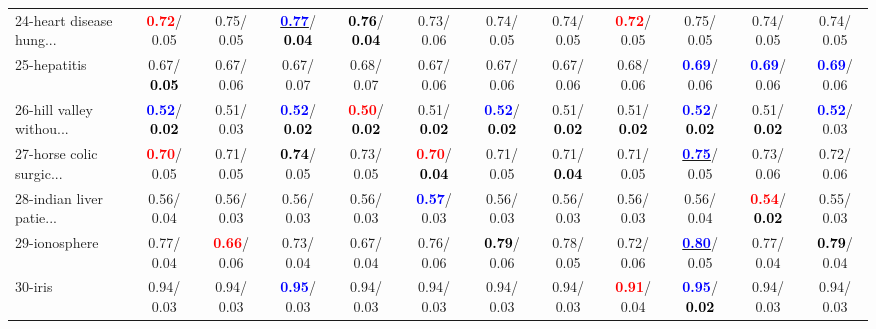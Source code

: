 \begin{table}[h]
\begin{center}
{\begin{tabular}{lc|c|c|c|c|c|c|c|c|c|c}
24-heart disease hung... & \textcolor{red}{\textbf{  0.72}}/  0.05 &   0.75/  0.05 & \underline{\textcolor{blue}{\textbf{  0.77}}}/\textcolor{black}{\textbf{  0.04}} & \textcolor{black}{\textbf{  0.76}}/\textcolor{black}{\textbf{  0.04}} &   0.73/  0.06 &   0.74/  0.05 &   0.74/  0.05 & \textcolor{red}{\textbf{  0.72}}/  0.05 &   0.75/  0.05 &   0.74/  0.05 &   0.74/  0.05 \\
25-hepatitis &   0.67/\textcolor{black}{\textbf{  0.05}} &   0.67/  0.06 &   0.67/  0.07 &   0.68/  0.07 &   0.67/  0.06 &   0.67/  0.06 &   0.67/  0.06 &   0.68/  0.06 & \textcolor{blue}{\textbf{  0.69}}/  0.06 & \textcolor{blue}{\textbf{  0.69}}/  0.06 & \textcolor{blue}{\textbf{  0.69}}/  0.06 \\
26-hill valley withou... & \textcolor{blue}{\textbf{  0.52}}/\textcolor{black}{\textbf{  0.02}} &   0.51/  0.03 & \textcolor{blue}{\textbf{  0.52}}/\textcolor{black}{\textbf{  0.02}} & \textcolor{red}{\textbf{  0.50}}/\textcolor{black}{\textbf{  0.02}} &   0.51/\textcolor{black}{\textbf{  0.02}} & \textcolor{blue}{\textbf{  0.52}}/\textcolor{black}{\textbf{  0.02}} &   0.51/\textcolor{black}{\textbf{  0.02}} &   0.51/\textcolor{black}{\textbf{  0.02}} & \textcolor{blue}{\textbf{  0.52}}/\textcolor{black}{\textbf{  0.02}} &   0.51/\textcolor{black}{\textbf{  0.02}} & \textcolor{blue}{\textbf{  0.52}}/  0.03 \\
27-horse colic surgic... & \textcolor{red}{\textbf{  0.70}}/  0.05 &   0.71/  0.05 & \textcolor{black}{\textbf{  0.74}}/  0.05 &   0.73/  0.05 & \textcolor{red}{\textbf{  0.70}}/\textcolor{black}{\textbf{  0.04}} &   0.71/  0.05 &   0.71/\textcolor{black}{\textbf{  0.04}} &   0.71/  0.05 & \underline{\textcolor{blue}{\textbf{  0.75}}}/  0.05 &   0.73/  0.06 &   0.72/  0.06 \\
28-indian liver patie... &   0.56/  0.04 &   0.56/  0.03 &   0.56/  0.03 &   0.56/  0.03 & \textcolor{blue}{\textbf{  0.57}}/  0.03 &   0.56/  0.03 &   0.56/  0.03 &   0.56/  0.03 &   0.56/  0.04 & \textcolor{red}{\textbf{  0.54}}/\textcolor{black}{\textbf{  0.02}} &   0.55/  0.03 \\ \hline
29-ionosphere &   0.77/  0.04 & \textcolor{red}{\textbf{  0.66}}/  0.06 &   0.73/  0.04 &   0.67/  0.04 &   0.76/  0.06 & \textcolor{black}{\textbf{  0.79}}/  0.06 &   0.78/  0.05 &   0.72/  0.06 & \underline{\textcolor{blue}{\textbf{  0.80}}}/  0.05 &   0.77/  0.04 & \textcolor{black}{\textbf{  0.79}}/  0.04 \\
30-iris &   0.94/  0.03 &   0.94/  0.03 & \textcolor{blue}{\textbf{  0.95}}/  0.03 &   0.94/  0.03 &   0.94/  0.03 &   0.94/  0.03 &   0.94/  0.03 & \textcolor{red}{\textbf{  0.91}}/  0.04 & \textcolor{blue}{\textbf{  0.95}}/\textcolor{black}{\textbf{  0.02}} &   0.94/  0.03 &   0.94/  0.03 \\

\end{tabular}}
\end{center}
\end{table}
